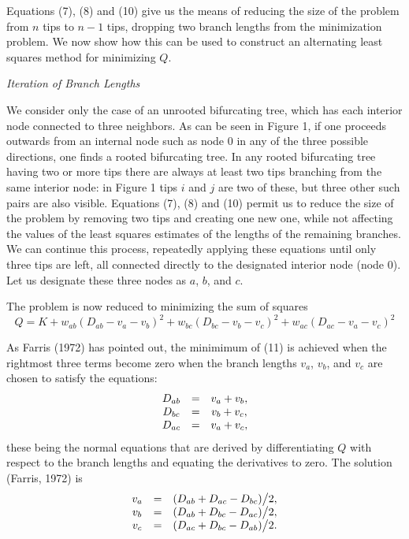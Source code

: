 \documentclass[12pt]{article}
\begin{document}
Equations (7), (8) and (10) give us the means of reducing the size of the
problem from $n$ tips to $n-1$ tips, dropping two branch lengths from the
minimization problem.  We now show how this can be used to
construct an alternating least squares method for minimizing $Q$.
\bigskip

\centerline{\it Iteration of Branch Lengths}
\bigskip

We consider only the case of an unrooted bifurcating tree, which has each
interior node connected to three neighbors.  As can be seen in Figure 1, 
if one proceeds outwards from an internal node such as node $0$ in any of the 
three possible directions,
one finds a rooted bifurcating tree.  In any rooted bifurcating tree having
two or more tips there are always at least two tips branching from the same 
interior node: in Figure 1 tips $i$ and $j$ are two of these, but three other
such pairs are also visible.  Equations (7), (8) and (10) permit us to
reduce the size of the problem by removing two tips and creating one new
one, while not affecting the values of the least squares estimates of the
lengths of the remaining branches.  We can continue this process, repeatedly 
applying these
equations until only three tips are left, all connected directly to the
designated interior node (node 0).  Let us designate these three nodes as $a$,
$b$, and $c$.

The problem is now reduced to minimizing the sum of squares
\begin{equation} %
     Q   =   K  +  w_{ab} (D_{ab} - v_a - v_b)^2  + w_{bc} (D_{bc} - v_b - v_c)^2 +  w_{ac} (D_{ac} - v_a - v_c)^2
\end{equation}

As Farris (1972) has pointed out, the minimimum of (11) is achieved when the
rightmost three terms become zero when the branch lengths $v_a$, $v_b$,
and $v_c$ are chosen to satisfy the equations:
\begin{equation} %
\begin{array}{c c c}
     D_{ab}  &  = &   v_a  +  v_b, \\
     D_{bc}  & = &  v_b  +  v_c,\\
     D_{ac} &  = &  v_a  +  v_c,
\end{array}
\end{equation}
\noindent
these being the normal equations that are derived by differentiating $Q$ with
respect to the branch lengths and equating the derivatives to zero.  The
solution (Farris, 1972) is
\begin{equation} %
\begin{array}{c c c}
    v_a &  = &  (D_{ab}  +  D_{ac}  -  D_{bc}) \big/ 2,\\
    v_b &  = &  (D_{ab}  +  D_{bc}  -  D_{ac}) \big/ 2,\\
    v_c &  = &  (D_{ac}  +  D_{bc}  -  D_{ab}) \big/ 2.
\end{array}
\end{equation}
\end{document}
